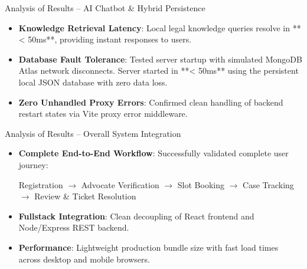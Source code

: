 \documentclass[10pt,aspectratio=169]{beamer}
\begin{document}
\begin{frame}{Analysis of Results -- AI Chatbot \& Hybrid Persistence}
  \begin{itemize}
    \setlength{\itemsep}{10pt}
    \item \textbf{Knowledge Retrieval Latency}: Local legal knowledge queries resolve in **< 50ms**, providing instant responses to users.
    \item \textbf{Database Fault Tolerance}: Tested server startup with simulated MongoDB Atlas network disconnects. Server started in **< 50ms** using the persistent local JSON database with zero data loss.
    \item \textbf{Zero Unhandled Proxy Errors}: Confirmed clean handling of backend restart states via Vite proxy error middleware.
  \end{itemize}
\end{frame}

\begin{frame}{Analysis of Results -- Overall System Integration}
  \begin{itemize}
    \setlength{\itemsep}{10pt}
    \item \textbf{Complete End-to-End Workflow}: Successfully validated complete user journey:
      \begin{center}
        \small Registration $\rightarrow$ Advocate Verification $\rightarrow$ Slot Booking $\rightarrow$ Case Tracking $\rightarrow$ Review & Ticket Resolution
      \end{center}
    \item \textbf{Fullstack Integration}: Clean decoupling of React frontend and Node/Express REST backend.
    \item \textbf{Performance}: Lightweight production bundle size with fast load times across desktop and mobile browsers.
  \end{itemize}
\end{frame}
\end{document}
